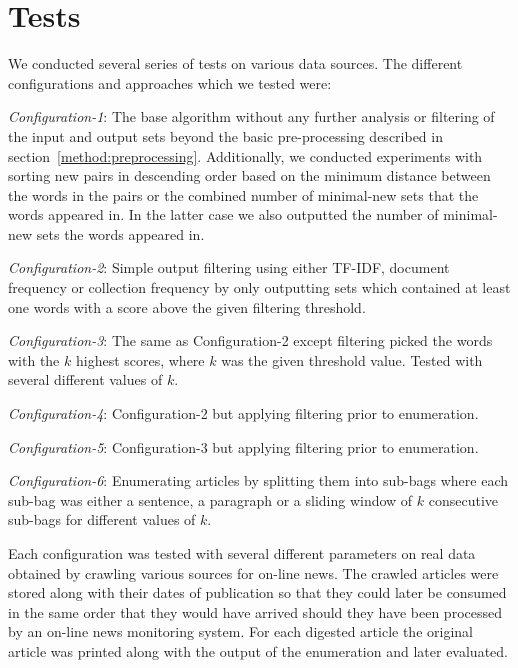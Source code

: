\section{Tests}
We conducted several series of tests on various data sources. The different configurations and approaches which we tested were:

\emph{Configuration-1}: The base algorithm without any further analysis or filtering of the input and output sets beyond the basic pre-processing described in section~\ref{method:preprocessing}. Additionally, we conducted experiments with sorting new pairs in descending order based on the minimum distance between the words in the pairs or the combined number of minimal-new sets that the words appeared in. In the latter case we also outputted the number of minimal-new sets the words appeared in.

\emph{Configuration-2}: Simple output filtering using either TF-IDF, document frequency or collection frequency by only outputting sets which contained at least one words with a score above the given filtering threshold. 

\emph{Configuration-3}: The same as Configuration-2 except filtering picked the words with the $k$ highest scores, where $k$ was the given threshold value. Tested with several different values of $k$.

\emph{Configuration-4}: Configuration-2 but applying filtering prior to enumeration.

\emph{Configuration-5}: Configuration-3 but applying filtering prior to enumeration.

\emph{Configuration-6}: Enumerating articles by splitting them into sub-bags where each sub-bag was either a sentence, a paragraph or a sliding window of $k$ consecutive sub-bags for different values of $k$.



Each configuration was tested with several different parameters on real data obtained by crawling various sources for on-line news. The crawled articles were stored along with their dates of publication so that they could later be consumed in the same order that they would have arrived should they have been processed by an on-line news monitoring system. For each digested article the original article was printed along with the output of the enumeration and later evaluated. 

